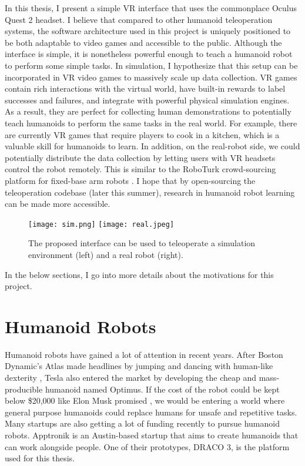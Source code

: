 In this thesis, I present a simple VR interface that uses the commonplace Oculus Quest 2 headset. I believe that compared to other humanoid teleoperation systems, the software architecture used in this project is uniquely positioned to be both adaptable to video games and accessible to the public. Although the interface is simple, it is nonetheless powerful enough to teach a humanoid robot to perform some simple tasks. In simulation, I hypothesize that this setup can be incorporated in VR video games to massively scale up data collection. VR games contain rich interactions with the virtual world, have built-in rewards to label successes and failures, and integrate with powerful physical simulation engines. As a result, they are perfect for collecting human demonstrations to potentially teach humanoids to perform the same tasks in the real world. For example, there are currently VR games that require players to cook in a kitchen, which is a valuable skill for humanoids to learn. In addition, on the real-robot side, we could potentially distribute the data collection by letting users with VR headsets control the robot remotely. This is similar to the RoboTurk crowd-sourcing platform for fixed-base arm robots \cite{mandlekar2018roboturk}. I hope that by open-sourcing the teleoperation codebase (later this summer), research in humanoid robot learning can be made more accessible. 

\begin{figure}
	\centering
	\texttt{[image: sim.png]}
	\texttt{[image: real.jpeg]}
	\caption{The proposed interface can be used to teleoperate a simulation environment (left) and a real robot (right).}
\end{figure}

In the below sections, I go into more details about the motivations for this project.

\section{Humanoid Robots}
Humanoid robots have gained a lot of attention in recent years. After Boston Dynamic's Atlas made headlines by jumping and dancing with human-like dexterity \cite{atlas}, Tesla also entered the market by developing the cheap and mass-producible humanoid named Optimus. If the cost of the robot could be kept below \$20,000 like Elon Musk promised \cite{teslabot}, we would be entering a world where general purpose humanoids could replace humans for unsafe and repetitive tasks. Many startups are also getting a lot of funding recently to pursue humanoid robots. Apptronik is an Austin-based startup that aims to create humanoids that can work alongside people. One of their prototypes, DRACO 3, is the platform used for this thesis.

